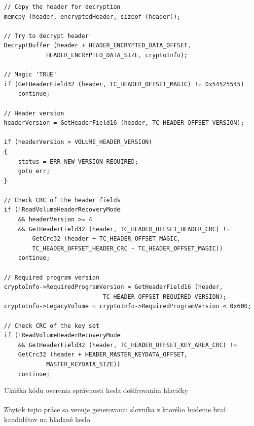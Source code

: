 \begin{listing}
\begin{verbatim}
// Copy the header for decryption
memcpy (header, encryptedHeader, sizeof (header));

// Try to decrypt header 
DecryptBuffer (header + HEADER_ENCRYPTED_DATA_OFFSET,
			HEADER_ENCRYPTED_DATA_SIZE, cryptoInfo);

// Magic 'TRUE'
if (GetHeaderField32 (header, TC_HEADER_OFFSET_MAGIC) != 0x54525545)
	continue;

// Header version
headerVersion = GetHeaderField16 (header, TC_HEADER_OFFSET_VERSION);

if (headerVersion > VOLUME_HEADER_VERSION)
{
	status = ERR_NEW_VERSION_REQUIRED;
	goto err;
}

// Check CRC of the header fields
if (!ReadVolumeHeaderRecoveryMode
	&& headerVersion >= 4
	&& GetHeaderField32 (header, TC_HEADER_OFFSET_HEADER_CRC) != 
		GetCrc32 (header + TC_HEADER_OFFSET_MAGIC, 
		TC_HEADER_OFFSET_HEADER_CRC - TC_HEADER_OFFSET_MAGIC))
	continue;

// Required program version
cryptoInfo->RequiredProgramVersion = GetHeaderField16 (header, 
							TC_HEADER_OFFSET_REQUIRED_VERSION);
cryptoInfo->LegacyVolume = cryptoInfo->RequiredProgramVersion < 0x600;

// Check CRC of the key set
if (!ReadVolumeHeaderRecoveryMode
	&& GetHeaderField32 (header, TC_HEADER_OFFSET_KEY_AREA_CRC) != 
	GetCrc32 (header + HEADER_MASTER_KEYDATA_OFFSET,
			MASTER_KEYDATA_SIZE))
	continue;
\end{verbatim}
\caption{Ukážka kódu overenia správnosti hesla dešifrovaním hlavičky}
\label{lst:tc2}
\end{listing}

\paragraph{}
Zbytok tejto práce sa venuje generovaniu slovníka z ktorého budeme brať kandidátov na hľadané heslo.